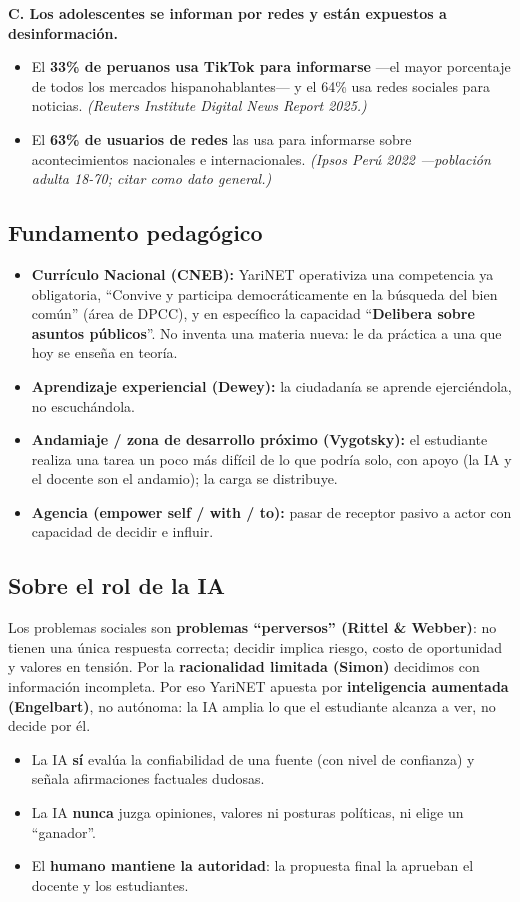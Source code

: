 \documentclass[11pt,a4paper]{article}
\begin{document}
\noindent\textbf{C. Los adolescentes se informan por redes y est\'an expuestos a desinformaci\'on.}
\begin{itemize}[leftmargin=*]
  \item El \textbf{33\% de peruanos usa TikTok para informarse} ---el mayor porcentaje de todos los mercados hispanohablantes--- y el 64\% usa redes sociales para noticias. \textit{(Reuters Institute Digital News Report 2025.)}
  \item El \textbf{63\% de usuarios de redes} las usa para informarse sobre acontecimientos nacionales e internacionales. \textit{(Ipsos Per\'u 2022 ---poblaci\'on adulta 18-70; citar como dato general.)}
\end{itemize}

\subsection{Fundamento pedag\'ogico}
\begin{itemize}[leftmargin=*]
  \item \textbf{Curr\'iculo Nacional (CNEB):} YariNET operativiza una competencia ya obligatoria, ``Convive y participa democr\'aticamente en la b\'usqueda del bien com\'un'' (\'area de DPCC), y en espec\'ifico la capacidad ``\textbf{Delibera sobre asuntos p\'ublicos}''. No inventa una materia nueva: le da pr\'actica a una que hoy se ense\~na en teor\'ia.
  \item \textbf{Aprendizaje experiencial (Dewey):} la ciudadan\'ia se aprende ejerci\'endola, no escuch\'andola.
  \item \textbf{Andamiaje / zona de desarrollo pr\'oximo (Vygotsky):} el estudiante realiza una tarea un poco m\'as dif\'icil de lo que podr\'ia solo, con apoyo (la IA y el docente son el andamio); la carga se distribuye.
  \item \textbf{Agencia (empower self / with / to):} pasar de receptor pasivo a actor con capacidad de decidir e influir.
\end{itemize}

\subsection{Sobre el rol de la IA}
Los problemas sociales son \textbf{problemas ``perversos'' (Rittel \& Webber)}: no tienen una \'unica respuesta correcta; decidir implica riesgo, costo de oportunidad y valores en tensi\'on. Por la \textbf{racionalidad limitada (Simon)} decidimos con informaci\'on incompleta. Por eso YariNET apuesta por \textbf{inteligencia aumentada (Engelbart)}, no aut\'onoma: la IA amplia lo que el estudiante alcanza a ver, no decide por \'el.
\begin{itemize}[leftmargin=*]
  \item La IA \textbf{s\'i} eval\'ua la confiabilidad de una fuente (con nivel de confianza) y se\~nala afirmaciones factuales dudosas.
  \item La IA \textbf{nunca} juzga opiniones, valores ni posturas pol\'iticas, ni elige un ``ganador''.
  \item El \textbf{humano mantiene la autoridad}: la propuesta final la aprueban el docente y los estudiantes.
\end{itemize}
\end{document}
